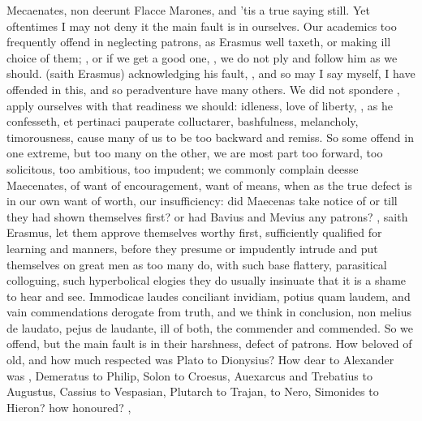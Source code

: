 {{Mecaenates, non deerunt Flacce Marones}, and 'tis a true saying still.
Yet oftentimes I may not deny it the main fault is in ourselves. Our
academics too frequently offend in neglecting patrons, as Erasmus
well taxeth, or making ill choice of them; , or if we get a good one, , we do not ply and follow him as we should.
 (saith Erasmus) acknowledging his fault,
, and so may I say myself, I have offended
in this, and so peradventure have many others. We did not spondere
, apply ourselves with
that readiness we should: idleness, love of liberty, , as he confesseth, et
pertinaci pauperate colluctarer, bashfulness, melancholy, timorousness,
cause many of us to be too backward and remiss. So some offend in one
extreme, but too many on the other, we are most part too forward, too
solicitous, too ambitious, too impudent; we commonly complain deesse
Maecenates, of want of encouragement, want of means, when as the true
defect is in our own want of worth, our insufficiency: did Maecenas
take notice of \Horace{} or \Virgil{} till they had shown themselves first?
or had Bavius and Mevius any patrons? , saith
Erasmus, let them approve themselves worthy first, sufficiently
qualified for learning and manners, before they presume or impudently
intrude and put themselves on great men as too many do, with such base
flattery, parasitical colloguing, such hyperbolical elogies they do
usually insinuate that it is a shame to hear and see. Immodicae laudes
conciliant invidiam, potius quam laudem, and vain commendations
derogate from truth, and we think in conclusion, non melius de laudato,
pejus de laudante, ill of both, the commender and commended. So we
offend, but the main fault is in their harshness, defect of patrons.
How beloved of old, and how much respected was Plato to Dionysius? How
dear to Alexander was \Aristotle, Demeratus to Philip, Solon to Croesus,
Auexarcus and Trebatius to Augustus, Cassius to Vespasian, Plutarch to
Trajan, \Seneca to Nero, Simonides to Hieron? how honoured?
,

}
